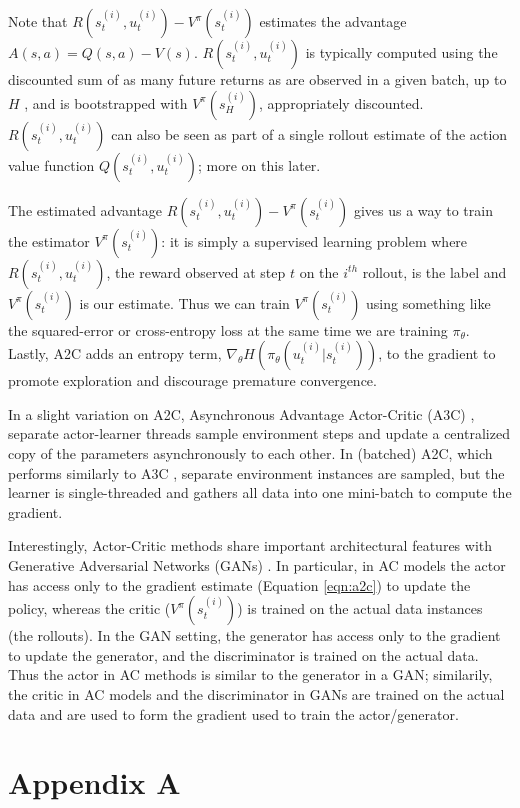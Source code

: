 \documentclass[11pt, oneside]{article}   	%
\begin{document}
\bigskip
\noindent
Note that $R(s^{(i)}_t, u^{(i)}_t)  - V^{\pi}(s^{(i)}_t)$ estimates the advantage $A(s, a) = Q(s, a) - V (s)$.  $R(s^{(i)}_t, u^{(i)}_t)$ 
is typically computed using the discounted sum of as many future returns as are observed in a given batch, up to $H$ , and is bootstrapped with $V^{\pi}(s^{(i)}_H)$, 
appropriately discounted. $R(s^{(i)}_t, u^{(i)}_t)$ can also be seen as part of a single rollout estimate of the action value function  $Q(s^{(i)}_t, u^{(i)}_t)$; more on this later.

\bigskip
\noindent
The estimated advantage $R(s^{(i)}_t, u^{(i)}_t) - V^{\pi}(s^{(i)}_t)$ gives us a way to train the estimator $V^{\pi}(s^{(i)}_t)$: it is simply a supervised learning problem
where $R(s^{(i)}_t, u^{(i)}_t)$, the reward observed at step $t$ on the $i^{th}$ rollout, is the label and $V^{\pi}(s^{(i)}_t)$ is our estimate. Thus we can train $V^{\pi}(s^{(i)}_t)$
using something like the squared-error or cross-entropy loss at the same time we are training $\pi_{\theta}$. Lastly, A2C adds an entropy term,
$\nabla_{\theta} H(\pi_{\theta} (u^{(i)}_t | s^{(i)}_t))$, to the gradient to promote exploration and discourage premature convergence.

\bigskip
\noindent
In a slight variation on A2C, Asynchronous Advantage Actor-Critic (A3C) \cite{2016arXiv160201783M}, separate actor-learner threads sample environment steps and update a 
centralized copy of the parameters asynchronously to each other. In (batched) A2C, which performs similarly to A3C \cite{2017arXiv170706347S}, separate environment instances 
are sampled, but the learner is single-threaded and gathers all data into one mini-batch to compute the gradient.

\bigskip
\noindent
Interestingly, Actor-Critic methods share important architectural features with Generative Adversarial Networks (GANs) \cite{2016arXiv160201783M}. In particular, in AC models the actor 
has access only to the gradient estimate (Equation \ref{eqn:a2c}) to update the policy, whereas the critic ($ V^{\pi}(s^{(i)}_t)$) is trained on the actual data instances (the rollouts).  In the GAN setting, 
the generator has access only to the gradient to update the generator, and the discriminator is trained on the actual data. Thus the actor in AC methods is similar to the generator in a GAN; similarily,
the critic in AC models and the discriminator in GANs are trained on the actual data and are used to form the gradient used to train the actor/generator. 
\newpage
\section{Appendix A}
\label{appendix:a}
\end{document}
